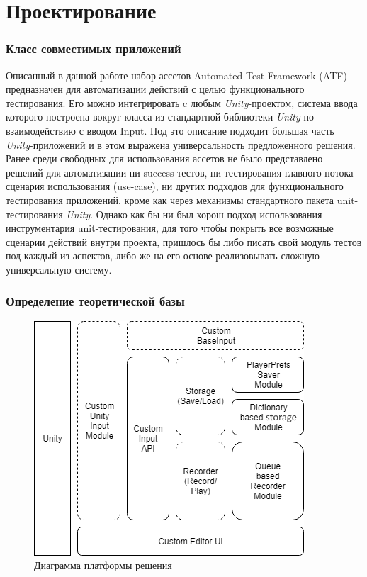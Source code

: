 \chapter{Проектирование}
\label{cha:ch_1}

\subsection{Класс совместимых приложений}
Описанный в данной работе набор ассетов Automated Test Framework (ATF) предназначен для автоматизации действий с целью функционального тестирования. Его можно интегрировать c любым  \textit{Unity}-проектом, система ввода которого построена вокруг класса из стандартной библиотеки \textit{Unity} по взаимодействию с вводом Input. Под это описание подходит большая часть \textit{Unity}-приложений и в этом выражена универсальность предложенного решения. Ранее среди свободных для использования ассетов не было представлено решений для автоматизации ни success-тестов, ни тестирования главного потока сценария использования (use-case), ни других подходов для функционального тестирования приложений, кроме как через механизмы стандартного пакета unit-тестирования \textit{Unity}. Однако как бы ни был хорош подход использования инструментария unit-тестирования, для того чтобы покрыть все возможные сценарии действий внутри проекта, пришлось бы либо писать свой модуль тестов под каждый из аспектов, либо же на его основе реализовывать сложную универсальную систему.

\subsection{Определение теоретической базы}
\begin{figure}[H]
	\centering
	\includegraphics[width=0.5\linewidth]{platform.png}
	\caption{Диаграмма платформы решения}
	\label{platform}
\end{figure}

